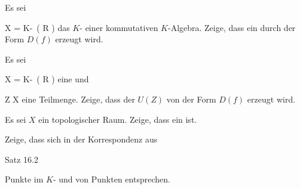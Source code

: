 \setcounter{section}{16}







{}
{





Es sei

\mavergleichskette
{\vergleichskette
{ X
}
{ = }{ K\!-\!\, \left(  R  \right)
}
{  }{
}
{    }{
}
{   }{
}
}
{}{}{}
das
$K$-
einer
kommutativen $K$-Algebra. Zeige, dass ein
durch
der Form $D(f)$ erzeugt wird.





}
{} {}

{}
{





Es sei

\mavergleichskette
{\vergleichskette
{ X
}
{ = }{ K\!-\!\, \left(  R  \right)
}
{  }{
}
{    }{
}
{   }{
}
}
{}{}{}
eine
und

\mavergleichskette
{\vergleichskette
{ Z
}
{ \subseteq }{ X
}
{  }{
}
{    }{
}
{   }{
}
}
{}{}{}
eine
Teilmenge. Zeige, dass der
$U(Z)$ von
der Form $D(f)$ erzeugt wird.





}
{} {}

{}
{





Es sei $X$ ein topologischer Raum. Zeige, dass ein
ist.





}
{} {}

{}
{





Zeige, dass sich in der Korrespondenz aus

Satz 16.2

Punkte im
$K$-
und
von Punkten entsprechen.





}
{} {}

